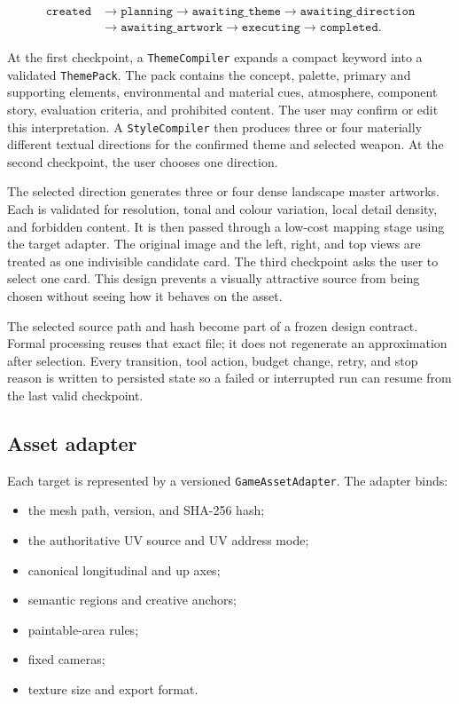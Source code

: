 \begin{align*}
\texttt{created} &\rightarrow \texttt{planning}
\rightarrow \texttt{awaiting\_theme}
\rightarrow \texttt{awaiting\_direction}\\
&\rightarrow \texttt{awaiting\_artwork}
\rightarrow \texttt{executing}
\rightarrow \texttt{completed}.
\end{align*}

At the first checkpoint, a \texttt{ThemeCompiler} expands a compact keyword into a
validated \texttt{ThemePack}. The pack contains the concept, palette, primary and
supporting elements, environmental and material cues, atmosphere, component
story, evaluation criteria, and prohibited content. The user may confirm or edit
this interpretation. A \texttt{StyleCompiler} then produces three or four
materially different textual directions for the confirmed theme and selected
weapon. At the second checkpoint, the user chooses one direction.

The selected direction generates three or four dense landscape master artworks.
Each is validated for resolution, tonal and colour variation, local detail
density, and forbidden content. It is then passed through a low-cost mapping stage
using the target adapter. The original image and the left, right, and top views are
treated as one indivisible candidate card. The third checkpoint asks the user to
select one card. This design prevents a visually attractive source from being
chosen without seeing how it behaves on the asset.

The selected source path and hash become part of a frozen design contract. Formal
processing reuses that exact file; it does not regenerate an approximation after
selection. Every transition, tool action, budget change, retry, and stop reason is
written to persisted state so a failed or interrupted run can resume from the last
valid checkpoint.

\subsection{Asset adapter}

Each target is represented by a versioned \texttt{GameAssetAdapter}. The adapter
binds:

\begin{itemize}
  \item the mesh path, version, and SHA-256 hash;
  \item the authoritative UV source and UV address mode;
  \item canonical longitudinal and up axes;
  \item semantic regions and creative anchors;
  \item paintable-area rules;
  \item fixed cameras;
  \item texture size and export format.
\end{itemize}

